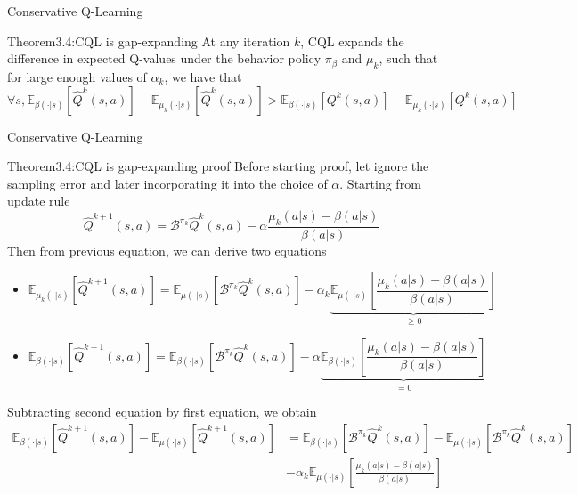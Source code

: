 \documentclass[11pt]{beamer}
\newcommand{\mbb}[1]{\mathbb{#1}}
\newcommand{\mc}[1]{\mathcal{#1}}
\begin{document}
\begin{frame}{Conservative Q-Learning}
  \begin{block}{Theorem3.4:CQL is gap-expanding}
    At any iteration $k$, CQL expands the difference in expected Q-values under the behavior policy $\pi_\beta$ and $\mu_k$, such that for large enough values of $\alpha_k$, we have that 
    \[
      \forall s, \mbb{E}_{\beta(\cdot|s)}[\hat{Q}^k (s,a)] - \mbb{E}_{\mu_k (\cdot|s)}[\hat{Q}^k (s,a)] > \mbb{E}_{\beta(\cdot|s)}[Q^k(s,a)] - \mbb{E}_{\mu_k(\cdot|s)}[Q^k(s,a)]
    \]
  \end{block}
\end{frame}

\begin{frame}{Conservative Q-Learning}
  \begin{block}{Theorem3.4:CQL is gap-expanding proof}
    Before starting proof, let ignore the sampling error and later incorporating it into the choice of $\alpha$.
    Starting from update rule
    \[
      \hat{Q}^{k+1} (s,a) = \mc{B}^{\pi_k} \hat{Q}^k (s,a) - \alpha \frac{\mu_k (a|s) - \beta (a|s)}{\beta (a|s)}
    \]
    Then from previous equation, we can derive two equations
    \begin{itemize}
      \item \[
      \mbb{E}_{\mu_k(\cdot|s)}[\hat{Q}^{k+1} (s,a)]= \mbb{E}_{\mu(\cdot|s)}[\mc{B}^{\pi_k} \hat{Q}^k (s,a)] - \alpha_k \underbrace{\mbb{E}_{\mu(\cdot|s)}\left[\frac{\mu_k (a|s) - \beta(a|s)}{\beta(a|s)}\right]}_{\geq 0}
      \]
      \item \[
       \mbb{E}_{\beta(\cdot|s)}[\hat{Q}^{k+1}(s,a)] = \mbb{E}_{\beta(\cdot|s)}[\mc{B}^{\pi_k} \hat{Q}^k (s,a)] - \alpha \underbrace{\mbb{E}_{\beta(\cdot|s)}\left[\frac{\mu_k (a|s) - \beta(a|s)}{\beta(a|s)}\right]}_{= 0}
      \]
    \end{itemize}
    Subtracting second equation by first equation, we obtain
    \[
    \begin{aligned}
      \mbb{E}_{\beta(\cdot|s)}[\hat{Q}^{k+1}(s,a)] - \mbb{E}_{\mu(\cdot|s)}[\hat{Q}^{k+1}(s,a)] &= \mbb{E}_{\beta(\cdot|s)}[\mc{B}^{\pi_k} \hat{Q}^k (s,a)] - \mbb{E}_{\mu(\cdot|s)}[\mc{B}^{\pi_k} \hat{Q}^k (s,a)] \\
      &- \alpha_k \mbb{E}_{\mu(\cdot|s)}\left[\frac{\mu_k(a|s) - \beta(a|s)}{\beta(a|s)}\right]
    \end{aligned}
    \]
  \end{block}
\end{frame}
\end{document}
